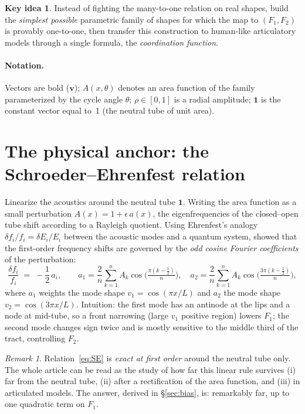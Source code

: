 \documentclass[11pt]{article}
\theoremstyle{definition}
\newtheorem{keyidea}{Key idea}
\theoremstyle{remark}
\newtheorem{remark}{Remark}
\newcommand{\Fone}{F_1}
\newcommand{\Ftwo}{F_2}
\begin{document}
\begin{keyidea}
Instead of fighting the many-to-one relation on real shapes, build the
\emph{simplest possible} parametric family of shapes for which the map to
$(\Fone,\Ftwo)$ is provably one-to-one, then transfer this construction
to human-like articulatory models through a single formula, the
\emph{coordination function}.
\end{keyidea}

\paragraph{Notation.}  Vectors are bold ($\bm{v}$); $A(x,\theta)$ denotes
an area function of the family parameterized by the cycle angle $\theta$;
$\rho\in[0,1]$ is a radial amplitude; $\bm{1}$ is the constant vector
equal to~1 (the neutral tube of unit area).

\section{The physical anchor: the Schroeder--Ehrenfest relation}

Linearize the acoustics around the neutral tube $\bm{1}$.  Writing the
area function as a small perturbation
$A(x)=1+\epsilon\,a(x)$, the eigenfrequencies of the closed--open tube
shift according to a Rayleigh quotient.  Using Ehrenfest's analogy
$\delta f_i/f_i=\delta E_i/E_i$ between the acoustic modes and a
quantum system, \citet{Schroeder1967} showed that the first-order
frequency shifts are governed by the \emph{odd cosine Fourier
coefficients} of the perturbation:
\begin{equation}
\frac{\delta f_i}{f_i}\;=\;-\frac{1}{2}\,a_i,
\qquad
a_1=\frac{2}{n}\sum_{k=1}^{n}A_k\cos\Big(\tfrac{\pi(k-\frac12)}{n}\Big),\quad
a_2=\frac{2}{n}\sum_{k=1}^{n}A_k\cos\Big(\tfrac{3\pi(k-\frac12)}{n}\Big),
\label{eq:SE}
\end{equation}
where $a_1$ weights the mode shape $v_1=\cos(\pi x/L)$ and $a_2$ the mode
shape $v_2=\cos(3\pi x/L)$.  Intuition: the first mode has an antinode at
the lips and a node at mid-tube, so a front narrowing (large $v_1$
positive region) lowers $\Fone$; the second mode changes sign twice and
is mostly sensitive to the middle third of the tract, controlling
$\Ftwo$.

\begin{remark}
Relation~\eqref{eq:SE} is \emph{exact at first order} around the neutral
tube only.  The whole article can be read as the study of how far this
linear rule survives (i) far from the neutral tube, (ii) after a
rectification of the area function, and (iii) in articulated models.  The
answer, derived in \S\ref{sec:bias}, is: remarkably far, up to one
quadratic term on $\Fone$.
\end{remark}
\end{document}
